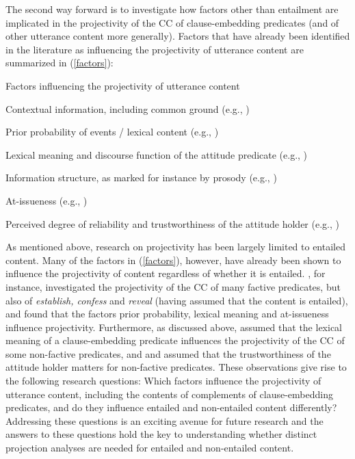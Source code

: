 \documentclass[11pt,fleqn]{article}
\newcommand{\6}{\mbox{$[\hspace*{-.6mm}[$}}
\newcommand{\9}{\mbox{$]\hspace*{-.6mm}]$}}
\begin{document}
{\begin{itemize}
The second way forward is to investigate how factors other than entailment are implicated in the projectivity of the CC of clause-embedding predicates (and of other utterance content more generally). Factors that have already been identified in the literature as influencing the projectivity of utterance content are summarized in (\ref{factors}): 

\begin{exe}
\ex\label{factors} Factors influencing the projectivity of utterance content
\begin{xlist}

\ex Contextual information, including common ground (e.g., \citealt{gazdar79a,gazdar79b,tonhauser-etal-eval})

\ex Prior probability of events / lexical content (e.g., \citealt{tbd-variability})

\ex Lexical meaning and discourse function of the attitude predicate (e.g., \citealt{anand-hacquard2014,tbd-variability})

\ex Information structure, as marked for instance by prosody (e.g., \citealt{cummins-rohde2015,tonhauser-salt26,djaerv-bacovcin-salt27})

\ex At-issueness (e.g., \citealt{brst-salt10,best-question,abrusan2011,tbd-variability,mahler-nels})

\ex Perceived degree of reliability and trustworthiness of the attitude holder (e.g., \citealt{schlenker10,demarneffe-etal2012})

\end{xlist}
\end{exe}

As mentioned above, research on projectivity has been largely limited to entailed content. Many of the factors in (\ref{factors}), however, have already been shown to influence the projectivity of content regardless of whether it is entailed. \citet{tbd-variability}, for instance, investigated the projectivity of the CC of many factive predicates, but also of {\em establish, confess} and {\em reveal} (having assumed that the content is entailed), and found that the factors prior probability, lexical meaning and at-issueness influence projectivity. Furthermore, as discussed above, \citet{anand-hacquard2014} assumed that the lexical meaning of a clause-embedding predicate influences the projectivity of the CC of some non-factive predicates, and \citealt{schlenker10} and \citealt{demarneffe-etal2012} assumed that the trustworthiness of the attitude holder matters for non-factive predicates. These observations give rise to the following research questions: Which factors influence the projectivity of utterance content, including the contents of complements of clause-embedding predicates, and do they influence entailed and non-entailed content differently? Addressing these questions is an exciting avenue for future research and the answers to these questions hold the key to understanding whether distinct projection analyses are needed for entailed and non-entailed content.


\end{itemize}}
\end{document}
